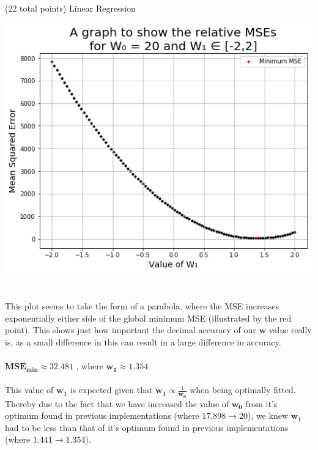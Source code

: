 \documentclass[12pt]{article}
\begin{document}
\begin{question}{(22 total points) Linear Regression}
\begin{subquestion}
\begin{answerbox}{48.5em}
\includegraphics [width=1\textwidth]{images/q1g-graph.png}\\
\\
\\
This plot seems to take the form of a parabola, where the MSE increases exponentially either side of the global minimum MSE (illustrated by the red point). This shows just how important the decimal accuracy of our $\mathbf{w}$ value really is, as a small difference in this can result in a large difference in accuracy.\\
\\
$\mathbf{MSE_{min} \approx 32.481}$ ,  where $\mathbf{w_1 \approx 1.354}$\\
\\
This value of $\mathbf{w_1}$ is expected given that $\mathbf{w_1} \propto \frac{1}{\mathbf{w_0}}$ when being optimally fitted. Thereby due to the fact that we have increased the value of $\mathbf{w_0}$ from it's optimum found in previous implementations (where $17.898 \to 20$), we knew $\mathbf{w_1}$ had to be less than that of it's optimum found in previous implementations (where $1.441 \to 1.354$).
\end{answerbox}



\end{subquestion}


 
\end{question}
\end{document}
